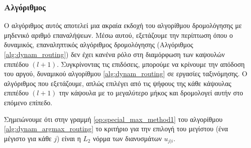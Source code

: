 
\subsubsection{Αλγόριθμος }
Ο αλγόριθμος αυτός αποτελεί μια ακραία εκδοχή του αλγορίθμου δρομολόγησης με μηδενικό αριθμό επαναλήψεων. Μέσω αυτού, εξετάζουμε την περίπτωση όπου ο δυναμικός, επαναληπτικός αλγόριθμος δρομολόγησης (Αλγόριθμος \ref{alg:dynam_routing}) δεν έχει κανένα ρόλο στη διαμόρφωση των καψουλών επιπέδου $(l+1)$. Συγκρίνοντας τις επιδόσεις, μπορούμε να κρίνουμε την απόδοση του αργού, δυναμικού αλγορίθμου \ref{alg:dynam_routing} σε εργασίες ταξινόμησης. Ο αλγόριθμος που εξετάζουμε, απλώς επιλέγει από τις ψήφους της κάθε κάψουλας επιπέδου $(l+1)$ την κάψουλα με το μεγαλύτερο μήκος και δρομολογεί αυτήν στο επόμενο επίπεδο.

Σημειώνουμε ότι στην γραμμή \ref{op:special_max_method1} του αλγορίθμου \ref{alg:dynam_argmax_routing} το κριτήριο για την επιλογή του μεγίστου (ένα μέγιστο για κάθε $j$) είναι η $L_2$ νόρμα των διανυσμάτων $\hat{u}_{j|i}$.

